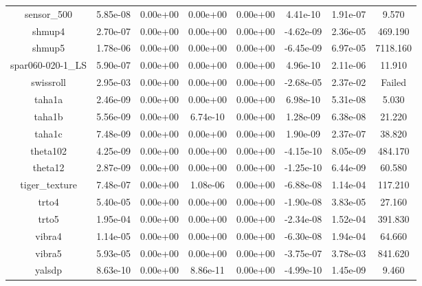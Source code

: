 {{\begin{table}[h]
\begin{center}
{\begin{tabular}{cccccccc}
          sensor\_500 & 5.85e-08 & 0.00e+00 & 0.00e+00 & 0.00e+00 & 4.41e-10 & 1.91e-07 & 9.570 \\ 
              shmup4 & 2.70e-07 & 0.00e+00 & 0.00e+00 & 0.00e+00 & -4.62e-09 & 2.36e-05 & 469.190 \\ 
              shmup5 & 1.78e-06 & 0.00e+00 & 0.00e+00 & 0.00e+00 & -6.45e-09 & 6.97e-05 & 7118.160 \\ 
    spar060-020-1\_LS & 5.90e-07 & 0.00e+00 & 0.00e+00 & 0.00e+00 & 4.96e-10 & 2.11e-06 & 11.910 \\ 
           swissroll & 2.95e-03 & 0.00e+00 & 0.00e+00 & 0.00e+00 & -2.68e-05 & 2.37e-02 & Failed \\ 
              taha1a & 2.46e-09 & 0.00e+00 & 0.00e+00 & 0.00e+00 & 6.98e-10 & 5.31e-08 & 5.030 \\ 
              taha1b & 5.56e-09 & 0.00e+00 & 6.74e-10 & 0.00e+00 & 1.28e-09 & 6.38e-08 & 21.220 \\ 
              taha1c & 7.48e-09 & 0.00e+00 & 0.00e+00 & 0.00e+00 & 1.90e-09 & 2.37e-07 & 38.820 \\ 
            theta102 & 4.25e-09 & 0.00e+00 & 0.00e+00 & 0.00e+00 & -4.15e-10 & 8.05e-09 & 484.170 \\ 
             theta12 & 2.87e-09 & 0.00e+00 & 0.00e+00 & 0.00e+00 & -1.25e-10 & 6.44e-09 & 60.580 \\ 
       tiger\_texture & 7.48e-07 & 0.00e+00 & 1.08e-06 & 0.00e+00 & -6.88e-08 & 1.14e-04 & 117.210 \\ 
               trto4 & 5.40e-05 & 0.00e+00 & 0.00e+00 & 0.00e+00 & -1.90e-08 & 3.83e-05 & 27.160 \\ 
               trto5 & 1.95e-04 & 0.00e+00 & 0.00e+00 & 0.00e+00 & -2.34e-08 & 1.52e-04 & 391.830 \\ 
              vibra4 & 1.14e-05 & 0.00e+00 & 0.00e+00 & 0.00e+00 & -6.30e-08 & 1.94e-04 & 64.660 \\ 
              vibra5 & 5.93e-05 & 0.00e+00 & 0.00e+00 & 0.00e+00 & -3.75e-07 & 3.78e-03 & 841.620 \\ 
              yalsdp & 8.63e-10 & 0.00e+00 & 8.86e-11 & 0.00e+00 & -4.99e-10 & 1.45e-09 & 9.460 \\ 
      \bottomrule
    \end{tabular}
  }  
\end{center}  
\end{table}}}




